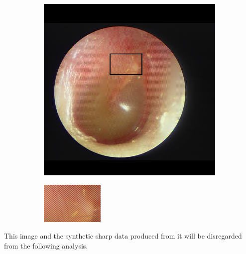\begin{figure}[H]
    \centering
    \begin{subfigure}[t]{0.48\textwidth}
	    \centering
	    \includegraphics[height=.66\textwidth]{Figures/lv/33.png}
	    \caption{}
    \end{subfigure}\hspace{1em}
    \begin{subfigure}[t]{0.48\textwidth}
	    \centering
	    \includegraphics[height=.66\textwidth]{Figures/lv/33_zoom.png}
	    \caption{}
    \end{subfigure}\hspace{1em}
\end{figure}

This image and the synthetic sharp data produced from it will be disregarded from the following analysis.


